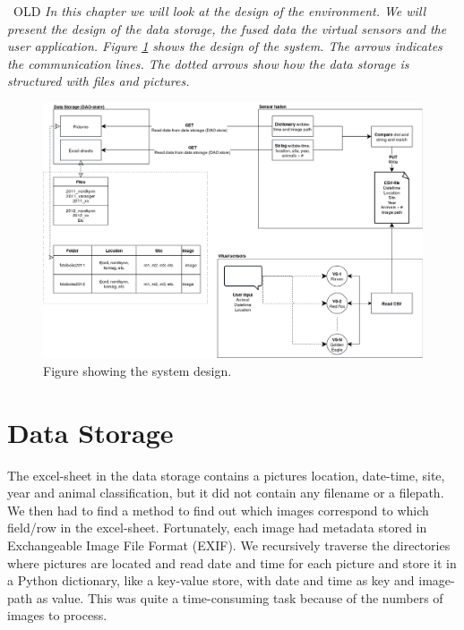 \documentclass[USenglish]{uit-thesis}
\begin{document}
\ OLD
\textit{In this chapter we will look at the design of the environment. We will present the design of the data storage, the fused data the virtual sensors and the user application. Figure \ref{fig:design} shows the design of the system. The arrows indicates the communication lines. The dotted arrows show how the data storage is structured with files and pictures.}


\begin{figure}
\centering
\includegraphics[width=\textwidth]{Design.png}
\caption{Figure showing the system design.}
\label{fig:design}
\end{figure}

\section{Data Storage} \label{ssec:des_fused}

The excel-sheet in the data storage contains a pictures location, date-time, site, year and animal classification, but it did not contain any filename or a filepath. We then had to find a method to find out which images correspond to which field/row in the excel-sheet. Fortunately, each image had metadata stored in Exchangeable Image File Format (EXIF). We recursively traverse the directories where pictures are located and read date and time for each picture and store it in a Python dictionary, like a key-value store, with date and time as key and image-path as value. This was quite a time-consuming task because of the numbers of images to process.
\end{document}
